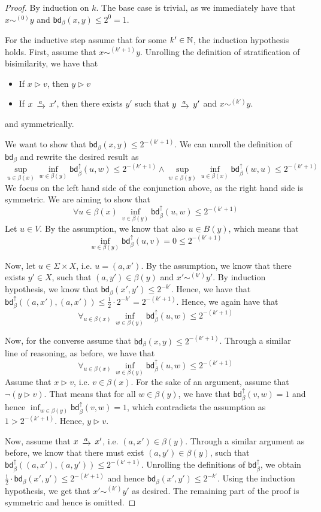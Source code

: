 \begin{proof}
	By induction on $k$. The base case is trivial, as we immediately have that $x \sim^{(0)} y$ and $\mathsf{bd}_\beta(x,y) \leq 2^{0} = 1$.
	
	For the inductive step assume that for some $k' \in \mathbb{N}$, the induction hypothesis holds. First, assume that $x \sim^{(k'+1)} y$. Unrolling the definition of stratification of bisimilarity, we have that
	\begin{itemize}
		\item If $x \rhd v$, then $y \rhd v$
		\item If $x \tr{a} x'$, then there exists $y'$ such that $y \tr{a} y'$ and $x \sim^{(k')} y$.
	\end{itemize}
	and symmetrically.
	
	We want to show that $\mathsf{bd}_\beta(x,y) \leq 2^{-(k'+1)}$. We can unroll the definition of $\mathsf{bd}_\beta$ and rewrite the desired result as
	$$
	\sup_{u \in \beta(x)} \inf_{w \in \beta(y)} \mathsf{bd}_\beta^\uparrow(u,w)  \leq 2^{-(k'+1)} \wedge \sup_{w \in \beta(y)} \inf_{u \in \beta(x)} \mathsf{bd}_\beta^\uparrow(w,u)  \leq 2^{-(k'+1)}
	$$
	We focus on the left hand side of the conjunction above, as the right hand side is symmetric. We are aiming to show that
	$$
	\forall {u \in \beta(x)}~\inf_{v \in \beta(y)} \mathsf{bd}_\beta^\uparrow(u,w)  \leq 2^{-(k'+1)} 
	$$
	Let $u \in V$. By the assumption, we know that also $u \in B(y)$, which means that $$\inf_{w \in \beta(y)} \mathsf{bd}_\beta^\uparrow(u,v) = 0 \leq 2^{-(k'+1)}$$
	
	Now, let $u \in \Sigma \times X$, i.e. $u = (a,x')$. By the assumption, we know that there exists $y' \in X$, such that $(a,y') \in \beta(y)$ and $x' \sim^{(k')} y'$. By induction hypothesis, we know that $\mathsf{bd}_{\beta}(x',y') \leq 2^{-k'}$. Hence, we have that $\mathsf{bd}_{\beta}^\uparrow((a,x'),(a,x')) \leq \frac{1}{2} \cdot  2^{-k'} = 2^{-(k'+1)}$. Hence, we again have that 
		$$
		\forall_{u \in \beta(x)}~\inf_{w \in \beta(y)} \mathsf{bd}_\beta^\uparrow(u,w)  \leq 2^{-(k'+1)} 
		$$
		
		Now, for the converse assume that $\mathsf{bd}_\beta(x,y) \leq 2^{-(k'+1)}$. Through a similar line of reasoning, as before, we have that
		$$
		\forall_{u \in \beta(x)}~\inf_{w \in \beta(y)} \mathsf{bd}_\beta^\uparrow(u,w) \leq 2^{-(k'+1)} 
		$$
		Assume that $x \rhd v$, i.e. $v \in \beta(x)$. For the sake of an argument, assume that $\neg (y \rhd v)$. That means that for all $w \in \beta(y)$, we have that $\mathsf{bd}_\beta^\uparrow(v,w) = 1$ and hence $\inf_{w \in \beta(y)} \mathsf{bd}_\beta^\uparrow(v,w)=1$, which contradicts the assumption as $1>2^{-{(k'+1)}}$. Hence, $y \rhd v$.
		
		Now, assume that $x \tr{a} x'$, i.e. $(a,x') \in \beta(y)$. Through a similar argument as before, we know that there must exist $(a,y')\in \beta(y)$, such that $\mathsf{bd}_\beta^\uparrow((a,x'),(a,y')) \leq 2^{-(k'+1)}$. Unrolling the definitions of $\mathsf{bd}_\beta^\uparrow$, we obtain $\frac{1}{2} \cdot \mathsf{bd}_{\beta}(x',y') \leq 2^{-(k'+1)}$ and hence $\mathsf{bd}_{\beta}(x',y') \leq 2^{-k'}$. Using the induction hypothesis, we get that $x' \sim^{(k')} y'$ as desired. The remaining part of the proof is symmetric and hence is omitted.
\end{proof}
